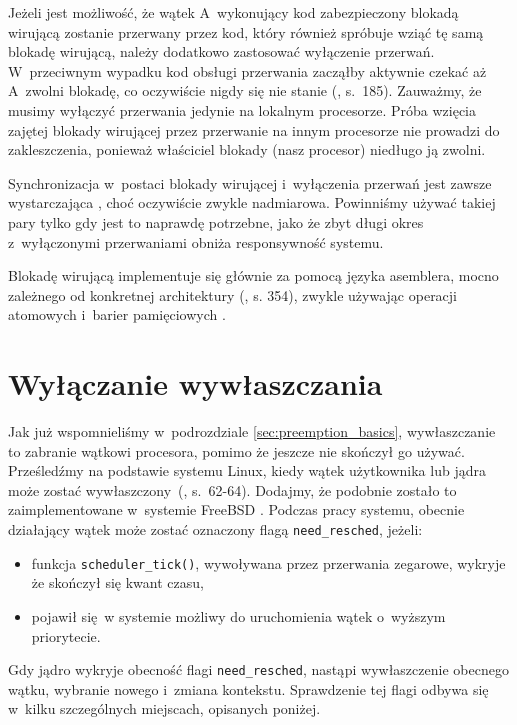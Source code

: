 \documentclass[shortabstract]{iithesis}
\theoremstyle{definition} \newtheorem*{definition}{Definicja}
\theoremstyle{definition} \newtheorem*{example}{Przykład}
\theoremstyle{definition} \newtheorem*{remark}{Uwaga}
\begin{document}
Jeżeli jest możliwość, że wątek A~wykonujący kod zabezpieczony blokadą wirującą zostanie przerwany przez kod,
który również spróbuje wziąć tę samą blokadę wirującą, należy dodatkowo zastosować wyłączenie przerwań.
W~przeciwnym wypadku kod obsługi przerwania zacząłby aktywnie czekać aż A~zwolni blokadę,
co oczywiście nigdy się nie stanie (\cite{bib:lkd}, s.~185). Zauważmy, że musimy wyłączyć przerwania jedynie
na lokalnym procesorze. Próba wzięcia zajętej blokady wirującej przez przerwanie na innym procesorze nie prowadzi
do zakleszczenia, ponieważ właściciel blokady (nasz procesor) niedługo ją zwolni.

Synchronizacja w~postaci blokady wirującej i~wyłączenia przerwań jest zawsze wystarczająca \cite{linux:spinlocks},
choć oczywiście zwykle nadmiarowa. Powinniśmy używać takiej pary tylko gdy jest to naprawdę potrzebne, jako że zbyt
długi okres z~wyłączonymi przerwaniami obniża responsywność systemu.

Blokadę wirującą implementuje się głównie za pomocą języka asemblera, mocno zależnego od konkretnej
architektury (\cite{bib:lka}, s. 354), zwykle używając operacji atomowych i~barier pamięciowych
\cite{bib:spin_impl1} \cite{bib:spin_impl2}.

\section{Wyłączanie wywłaszczania}
\label{sec:preemption_details}

Jak już wspomnieliśmy w~podrozdziale \ref{sec:preemption_basics},
wywłaszczanie to zabranie wątkowi procesora, pomimo że jeszcze nie
skończył go używać. Prześledźmy na podstawie systemu Linux, kiedy wątek użytkownika lub jądra
może zostać wywłaszczony~(\cite{bib:lkd}, s.~62-64). Dodajmy, że podobnie zostało to zaimplementowane
w~systemie FreeBSD \cite{bib:freebsd-critital_enter}.
Podczas pracy systemu, obecnie działający wątek może zostać oznaczony flagą \texttt{need\_resched},
jeżeli:
\begin{itemize}
\item funkcja \texttt{scheduler\_tick()}, wywoływana przez przerwania zegarowe, wykryje że skończył się kwant czasu,
\item pojawił się w systemie możliwy do uruchomienia wątek o~wyższym priorytecie.
\end{itemize}

Gdy jądro wykryje obecność flagi \texttt{need\_resched}, nastąpi wywłaszczenie obecnego wątku, wybranie nowego
i~zmiana kontekstu. Sprawdzenie tej flagi odbywa się w~kilku szczególnych miejscach, opisanych poniżej.
\end{document}
